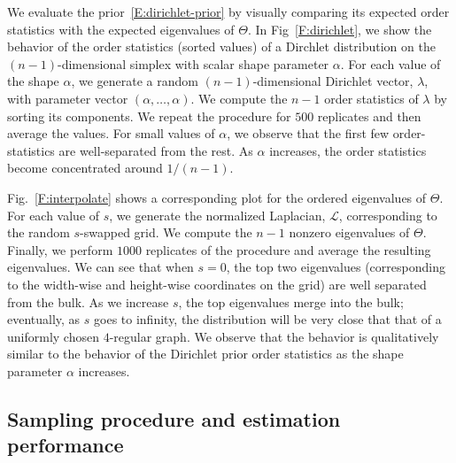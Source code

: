 \documentclass[12pt]{article}
\theoremstyle{plain}
\begin{document}
We evaluate the prior~\eqref{E:dirichlet-prior} by visually comparing
its expected order statistics with the expected eigenvalues of
$\Theta$.  In Fig~\ref{F:dirichlet}, we show the behavior of the order
statistics (sorted values) of a Dirchlet distribution on the
$(n-1)$-dimensional simplex with scalar shape parameter $\alpha$.  For
each value of the shape $\alpha$, we generate a random
$(n-1)$-dimensional Dirichlet vector, $\lambda$, with parameter vector
$(\alpha, \dotsc, \alpha)$.  We compute the $n-1$ order statistics of
$\lambda$ by sorting its components.  We repeat the procedure for
$500$ replicates and then average the values.  For small values of
$\alpha$, we observe that the first few order-statistics are
well-separated from the rest.  As $\alpha$ increases, the order
statistics become concentrated around $1/(n-1)$.

Fig.~\ref{F:interpolate} shows a corresponding plot for the ordered
eigenvalues of $\Theta$.
For each value of $s$, we generate the normalized
Laplacian, $\mathcal{L}$, corresponding to the random $s$-swapped
grid.  We compute the $n-1$ nonzero eigenvalues of $\Theta$.  Finally,
we perform $1000$ replicates of the procedure and average the
resulting eigenvalues. We can see that when $s = 0$, the top two eigenvalues
(corresponding to the width-wise and height-wise coordinates on the
grid) are well separated from the bulk.  As we increase $s$, the top
eigenvalues merge into the bulk; eventually, as $s$ goes to infinity,
the distribution will be very close that that of a uniformly chosen
$4$-regular graph.  We observe that the behavior is qualitatively
similar to the behavior of the Dirichlet prior order statistics as the
shape parameter $\alpha$ increases.


\subsection{Sampling procedure and estimation performance}\label{S:estimation}
\end{document}
